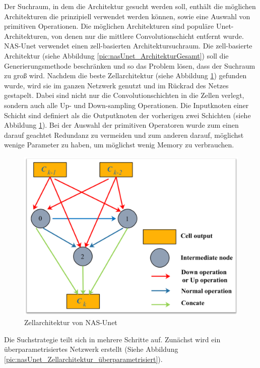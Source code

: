 Der Suchraum, in dem die Architektur gesucht werden soll, enthält die möglichen Architekturen die prinzipiell verwendet werden können, sowie eine Auswahl von primitiven Operationen. Die möglichen Architekturen sind populäre Unet-Architekturen, von denen nur die mittlere Convolutionschicht entfernt wurde. 
NAS-Unet verwendet einen zell-basierten Architektursuchraum. Die zell-basierte Architektur (siehe Abbildung \ref{pic:nasUnet_ArchitekturGesamt}) soll die Generierungsmethode beschränken und so das Problem lösen, dass der Suchraum zu groß wird. Nachdem die beste Zellarchitektur (siehe Abbildung \ref{pic:nasUnet_Zellarchitektur}) gefunden wurde, wird sie im ganzen Netzwerk genutzt und im Rückrad des Netzes gestapelt. Dabei sind nicht nur die Convolutionschichten in die Zellen verlegt, sondern auch alle Up- und Down-sampling Operationen. Die Inputknoten einer Schicht sind definiert als die Outputknoten der vorherigen zwei Schichten (siehe Abbildung \ref{pic:nasUnet_Zellarchitektur}). 
Bei der Auswahl der primitiven Operatoren wurde zum einen darauf geachtet Redundanz zu vermeiden und zum anderen darauf, möglichst wenige Parameter zu haben, um möglichst wenig Memory zu verbrauchen. 

\begin{figure}[H]
	
	\centering
	\includegraphics[scale=0.39]{Pictures/nasUnet/Bild2.png}
	\caption{Zellarchitektur von NAS-Unet \cite{nasunetPaper} }
	\label{pic:nasUnet_Zellarchitektur}
\end{figure}

Die Suchstrategie teilt sich in mehrere Schritte auf. Zunächst wird ein überparametrisiertes Netzwerk erstellt (Siehe Abbildung \ref{pic:nasUnet_Zellarchitektur_überparametrisiert}).

